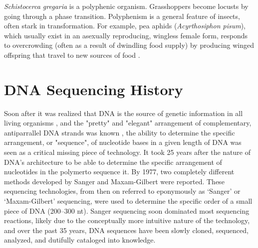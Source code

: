 \textit{Schistocerca gregaria} is a polyphenic organism. Grasshoppers become locusts by going through a phase transition. Polyphenism is a general feature of insects, often stark in transformation. For example, pea aphids (\textit{Acyrthosiphon pisum}), which usually exist in an asexually reproducing, wingless female form, responds to overcrowding (often as a result of dwindling food supply) by producing winged offspring that travel to new sources of food \citep{Shingleton2003,Purandare2014b}.


\section{DNA Sequencing History} %

Soon after it was realized that DNA is the source of genetic information in all living organisms \citep{Watson1953a}, and the "pretty" and "elegant" arrangement of complementary, antiparrallel DNA strands was known \citep{Watson2012a}, the ability to determine the specific arrangement, or "sequence", of nucleotide bases in a given length of DNA was seen as a critical missing piece of technology. It took 25 years after the nature of DNA's architecture to be able to determine the specific arrangement of nucleotides in the polymer\textemdash to sequence it. By 1977, two completely different methods developed by Sanger \citep{Sanger1975a,Sanger1977b} and Maxam-Gilbert \citep{Maxam1977a} were reported. These sequencing technologies, from then on referred to eponymously as ‘Sanger’ or ‘Maxam-Gilbert’ sequencing, were used to determine the specific order of a small piece of DNA (200–300 nt). Sanger sequencing soon dominated most sequencing reactions, likely due to the conceptually more intuitive nature of the technology, and over the past 35 years, DNA sequences have been slowly cloned, sequenced, analyzed, and dutifully cataloged into knowledge.

